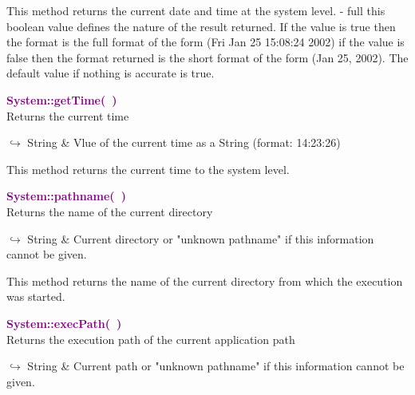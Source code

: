 \begin{tcolorbox}[width=\textwidth,myArgs,tabularx={ll|R}]

\end{tcolorbox}

This method returns the current date and time at the system level.
  - full this boolean value defines the nature of the result returned. If the value is true then the format is the full format of the form (Fri Jan 25 15:08:24 2002) if the value is false then the format returned is the short format of the form (Jan 25, 2002). The default value if nothing is accurate is true.

\textcolor{purple}{\textbf{System::getTime(~)}}\label{System::getTime()}\\
Returns the current time\vspace*{-0.5em}
\begin{tcolorbox}[grow to left by=-1cm, width=\textwidth-1cm,myArgs,tabularx={l|R}]
$\hookrightarrow$ String & Vlue of the current time as a String (format: 14:23:26)
\end{tcolorbox}

This method returns the current time to the system level.

\textcolor{purple}{\textbf{System::pathname(~)}}\label{System::pathname()}\\
Returns the name of the current directory\vspace*{-0.5em}
\begin{tcolorbox}[grow to left by=-1cm, width=\textwidth-1cm,myArgs,tabularx={l|R}]
$\hookrightarrow$ String & Current directory or "unknown pathname" if this information cannot be given.
\end{tcolorbox}

This method returns the name of the current directory from which the execution was started.

\textcolor{purple}{\textbf{System::execPath(~)}}\label{System::execPath()}\\
Returns the execution path of the current application path\vspace*{-0.5em}
\begin{tcolorbox}[grow to left by=-1cm, width=\textwidth-1cm,myArgs,tabularx={l|R}]
$\hookrightarrow$ String & Current path or "unknown pathname" if this information cannot be given.
\end{tcolorbox}

